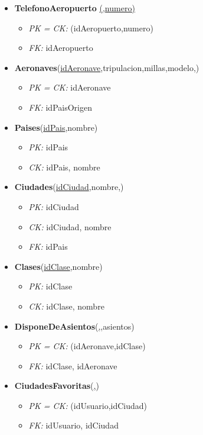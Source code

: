 \begin{itemize}
\begin{itemize}
		\end{itemize}
	\item \textbf{TelefonoAeropuerto} \underline{(,numero)}
		\begin{itemize}
			\item \textit{PK = CK: } (idAeropuerto,numero)
			\item \textit{FK: } idAeropuerto
		\end{itemize}
	\item \textbf{Aeronaves}(\underline{idAeronave},tripulacion,millas,modelo,)
		\begin{itemize}
			\item \textit{PK = CK: } idAeronave
			\item \textit{FK: } idPaisOrigen
		\end{itemize}
	\item \textbf{Paises}(\underline{idPais},nombre)
		\begin{itemize}
			\item \textit{PK: } idPais
			\item \textit{CK: } idPais, nombre
		\end{itemize}
	\item \textbf{Ciudades}(\underline{idCiudad},nombre,)
		\begin{itemize}
			\item \textit{PK: } idCiudad
			\item \textit{CK: } idCiudad, nombre
			\item \textit{FK: } idPais
		\end{itemize}
	\item \textbf{Clases}(\underline{idClase},nombre)
		\begin{itemize}
			\item \textit{PK: } idClase
			\item \textit{CK: } idClase, nombre
		\end{itemize}
	\item \textbf{DisponeDeAsientos}(\underline{,},asientos)
		\begin{itemize}
			\item \textit{PK = CK: } (idAeronave,idClase)
			\item \textit{FK: } idClase, idAeronave	
		\end{itemize}
	\item \textbf{CiudadesFavoritas}(\underline{,})
		\begin{itemize}
			\item \textit{PK = CK: } (idUsuario,idCiudad)
			\item \textit{FK: } idUsuario, idCiudad	
		\end{itemize}
\end{itemize}
